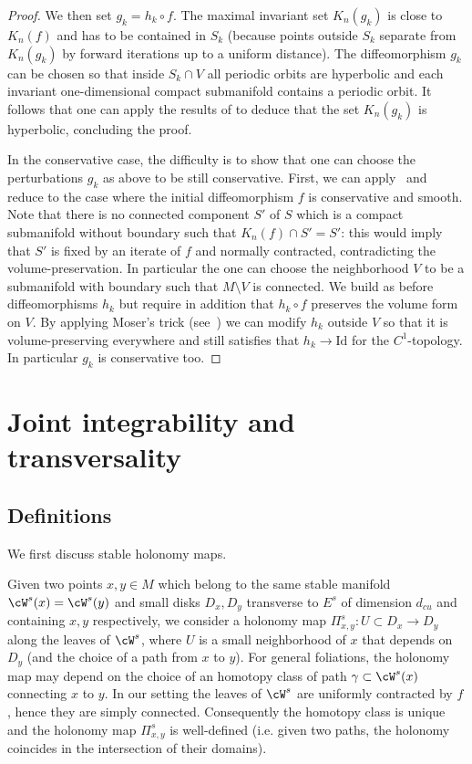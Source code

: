 \documentclass[a4paper,11pt]{amsart}
\numberwithin{equation}{section}     %
\theoremstyle{definition}
\theoremstyle{remark}
\begin{document}
\begin{proof}
We then set $g_k=h_k\circ f$. The maximal invariant set $K_{n}(g_k)$ is close to $K_n(f)$ and has to be contained in $S_k$ (because points outside $S_k$ separate from $K_n(g_k)$ by forward iterations up to a
uniform distance). The diffeomorphism $g_k$ can be chosen so that inside $S_k\cap V$ all periodic orbits are hyperbolic and each invariant one-dimensional compact submanifold contains a periodic orbit. It follows that one can apply the results of \cite{PS-IHP} to deduce that the set $K_n(g_k)$ is hyperbolic, concluding the proof. 

In the conservative case, the difficulty is to show that one can choose the perturbations $g_k$ as above to be still conservative. First, we can apply~\cite{Avila} and reduce to the case where the initial diffeomorphism $f$ is conservative and smooth. Note that there is no connected component $S'$ of $S$ which is a compact submanifold without boundary such that $K_n(f)\cap S'=S'$: this would imply that $S'$ is fixed by an iterate of $f$ and normally contracted, contradicting the volume-preservation. In particular the one can choose the neighborhood $V$ to be a submanifold with boundary such that $M\setminus V$ is connected. We build as before diffeomorphisms $h_k$ but require in addition that $h_k\circ f$ preserves the volume form on $V$. By applying Moser's trick (see~\cite[Theorem 5.1.27]{KH})
we can modify $h_k$ outside $V$ so that it is volume-preserving everywhere and still satisfies that $h_k\to \text{Id}$
for the $C^1$-topology. In particular $g_k$ is conservative too.
\end{proof}




\section{Joint integrability and transversality}\label{s.NJI}

\subsection{Definitions}\label{ss.def-transvserse}
We first discuss stable holonomy maps.

Given two points $x, y \in M$ which belong to the same stable manifold $\cW^s(x)=\cW^s(y)$ and small disks $D_x,D_y$ transverse to $E^s$ of dimension $d_{cu}$ and containing $x,y$ respectively, we consider a holonomy map $\Pi^s_{x,y} : U \subset D_x \to D_y$ along the leaves of $\cW^s$, where $U$ is a small neighborhood of $x$ that depends on $D_y$ (and the choice of a path from $x$ to $y$). For general foliations, the holonomy map may depend on the choice of an homotopy class of path $\gamma\subset \cW^s(x)$ connecting $x$ to $y$.
In our setting the leaves of $\cW^s$ are uniformly contracted by $f$, hence they are simply connected.
Consequently the homotopy class is unique and the holonomy map $\Pi^s_{x,y}$ is well-defined (i.e. given two paths, the holonomy coincides in the intersection of their domains).
\end{document}
